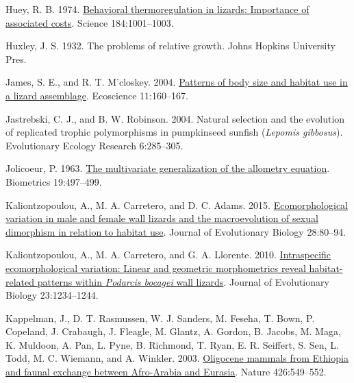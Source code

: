 \documentclass[
  11pt,
]{article}
\newlength{\cslhangindent}
\newlength{\cslentryspacingunit} %
\newenvironment{CSLReferences}[2] %
 {%
  \setlength{\parindent}{0pt}
  \ifodd #1
  \let\oldpar\par
  \def\par{\hangindent=\cslhangindent\oldpar}
  \fi
  \setlength{\parskip}{#2\cslentryspacingunit}
 }%
 {}
\begin{document}
\begin{CSLReferences}{1}{0}
\leavevmode{}%
Huey, R. B. 1974.
\href{https://doi.org/10.1126/science.184.4140.1001}{Behavioral
thermoregulation in lizards: Importance of associated costs}. Science
184:1001--1003.

\leavevmode{}%
Huxley, J. S. 1932. The problems of relative growth. Johns Hopkins
University Pres.

\leavevmode{}%
James, S. E., and R. T. M'closkey. 2004.
\href{https://doi.org/10.1080/11956860.2004.11682820}{Patterns of body
size and habitat use in a lizard assemblage}. Ecoscience 11:160--167.

\leavevmode{}%
Jastrebski, C. J., and B. W. Robinson. 2004. Natural selection and the
evolution of replicated trophic polymorphisms in pumpkinseed sunfish
(\emph{{L}epomis gibbosus}). Evolutionary Ecology Research 6:285--305.

\leavevmode{}%
Jolicoeur, P. 1963. \href{https://doi.org/10.2307/2527939}{The
multivariate generalization of the allometry equation}. Biometrics
19:497--499.

\leavevmode{}%
Kaliontzopoulou, A., M. A. Carretero, and D. C. Adams. 2015.
\href{https://doi.org/10.1111/jeb.12540}{Ecomorphological variation in
male and female wall lizards and the macroevolution of sexual dimorphism
in relation to habitat use}. Journal of Evolutionary Biology 28:80--94.

\leavevmode{}%
Kaliontzopoulou, A., M. A. Carretero, and G. A. Llorente. 2010.
\href{https://doi.org/10.1111/j.1420-9101.2010.01984.x}{Intraspecific
ecomorphological variation: Linear and geometric morphometrics reveal
habitat-related patterns within \emph{{P}odarcis bocagei} wall lizards}.
Journal of Evolutionary Biology 23:1234--1244.

\leavevmode{}%
Kappelman, J., D. T. Rasmussen, W. J. Sanders, M. Feseha, T. Bown, P.
Copeland, J. Crabaugh, J. Fleagle, M. Glantz, A. Gordon, B. Jacobs, M.
Maga, K. Muldoon, A. Pan, L. Pyne, B. Richmond, T. Ryan, E. R. Seiffert,
S. Sen, L. Todd, M. C. Wiemann, and A. Winkler. 2003.
\href{https://doi.org/10.1038/nature02102}{Oligocene mammals from
{Ethiopia} and faunal exchange between {Afro}-{Arabia} and {Eurasia}}.
Nature 426:549--552.


\end{CSLReferences}
\end{document}
